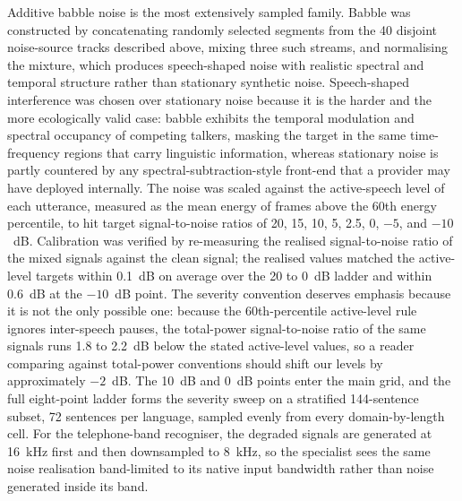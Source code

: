 Additive babble noise is the most extensively sampled family. Babble was
constructed by concatenating randomly selected segments from the 40 disjoint
noise-source tracks described above, mixing three such streams, and
normalising the mixture, which produces speech-shaped noise with realistic
spectral and temporal structure rather than stationary synthetic noise. Speech-shaped interference was chosen over stationary
noise because it is the harder and the more ecologically valid case: babble
exhibits the temporal modulation and spectral occupancy of competing talkers,
masking the target in the same time-frequency regions that carry linguistic
information, whereas stationary noise is partly countered by any
spectral-subtraction-style front-end that a provider may have deployed
internally. The
noise was scaled against the active-speech level of each utterance, measured
as the mean energy of frames above the 60th energy percentile, to hit target
signal-to-noise ratios of 20, 15, 10, 5, 2.5, 0, $-5$, and $-10$~dB.
Calibration was verified
by re-measuring the realised signal-to-noise ratio of the mixed signals
against the clean signal; the realised values matched the active-level targets
within 0.1~dB on average over the 20 to 0~dB ladder and within 0.6~dB at the
$-10$~dB point. The severity convention deserves emphasis because it is not
the only possible one: because the 60th-percentile active-level rule ignores
inter-speech pauses, the total-power signal-to-noise ratio of the same
signals runs 1.8 to 2.2~dB below the stated active-level values, so a
reader comparing against total-power conventions should shift our levels
by approximately $-2$~dB. The 10~dB and 0~dB points enter the main grid, and
the full eight-point ladder forms the severity sweep on a stratified
144-sentence subset, 72 sentences per language, sampled evenly from every
domain-by-length cell. For the telephone-band recogniser, the degraded
signals are generated at 16~kHz first and then downsampled to 8~kHz, so the
specialist sees the same noise realisation band-limited to its native input
bandwidth rather than noise generated inside its band.

